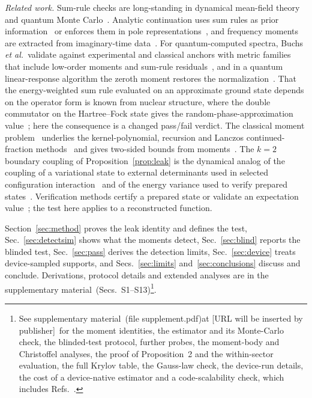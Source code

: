 \documentclass[aps,prb,reprint,onecolumn,12pt,superscriptaddress,longbibliography,floatfix]{revtex4-2}
\newcommand{\SMname}{supplementary material}
\newcommand{\SMname}{Supplemental Material}
\begin{document}
\emph{Related work.} Sum-rule checks are long-standing in dynamical mean-field theory and quantum Monte Carlo~\cite{TurkowskiFreericks2006,Freericks2009}. Analytic continuation uses sum rules as prior information~\cite{Jarrell1996,Sandvik1998} or enforces them in pole representations~\cite{HuangLiang2023,ZhangGull2024}, and frequency moments are extracted from imaginary-time data~\cite{Dornheim2023moments}. For quantum-computed spectra, Buchs \emph{et al.}\ validate against experimental and classical anchors with metric families that include low-order moments and sum-rule residuals~\cite{Buchs2026}, and in a quantum linear-response algorithm the zeroth moment restores the normalization~\cite{RoggeroCarlson2019}. That the energy-weighted sum rule evaluated on an approximate ground state depends on the operator form is known from nuclear structure, where the double commutator on the Hartree--Fock state gives the random-phase-approximation value~\cite{Thouless1961,LippariniStringari1989}; here the consequence is a changed pass/fail verdict. The classical moment problem~\cite{ShohatTamarkin1943,Akhiezer1965,KreinNudelman1977,GM2010} underlies the kernel-polynomial, recursion and Lanczos continued-fraction methods~\cite{KPM2006,Haydock1972,GaglianoBalseiro1987,Dagotto1994} and gives two-sided bounds from moments~\cite{Gordon1968,Langhoff1976,ChenTrogdonUbaru2021,AbbottJayOare2025}. The $k=2$ boundary coupling of Proposition~\ref{prop:leak} is the dynamical analog of the coupling of a variational state to external determinants used in selected configuration interaction~\cite{Huron1973} and of the energy variance used to verify prepared states~\cite{Kokail2019}. Verification methods certify a prepared state or validate an expectation value~\cite{Kokail2019,HuangPreskillSoleimanifar2024,OEACV2026}; the test here applies to a reconstructed function.

Section~\ref{sec:method} proves the leak identity and defines the test, Sec.~\ref{sec:detectsim} shows what the moments detect, Sec.~\ref{sec:blind} reports the blinded test, Sec.~\ref{sec:pass} derives the detection limits, Sec.~\ref{sec:device} treats device-sampled supports, and Secs.~\ref{sec:limits} and~\ref{sec:conclusions} discuss and conclude. Derivations, protocol details and extended analyses are in the \SMname\ (Secs.~S1--S13)\footnote{See \SMname\ \ifdefined\JPCM(file supplement.pdf)\else at [URL will be inserted by publisher]\fi\ for the moment identities, the estimator and its Monte-Carlo check, the blinded-test protocol, further probes, the moment-body and Christoffel analyses, the proof of Proposition~2 and the within-sector evaluation, the full Krylov table, the Gauss-law check, the device-run details, the cost of a device-native estimator and a code-scalability check\ifdefined\JPCM\else, which includes Refs.~\cite{CarleoTroyer2017,Hausman1978,Hubbard1963,LiebWu1968,Voit1995,KuhnerWhite1999,Jeckelmann2002,Schollwock2011,Georges1996,Gull2011,desCloizeauxPearson1962,Muller1981,PauwelsLasserre2019,LasserrePauwelsPutinar2022,Totik2000,MNT1991,DetteStudden1997,Nevai1986,CausalBootstrap2026,CertifiedSpectral2026,BatenkovClustered2020,KunisNagel2021,Donoho1992,Moitra2015,AkinshinGoldmanYomdin2021,Gautschi1962,Gautschi1963,Gauss2020,HalimehHauke2020,Martinez2016,Klco2018,Vovrosh2021,Kiss2025,Vallury2023}\fi.}.
\end{document}
